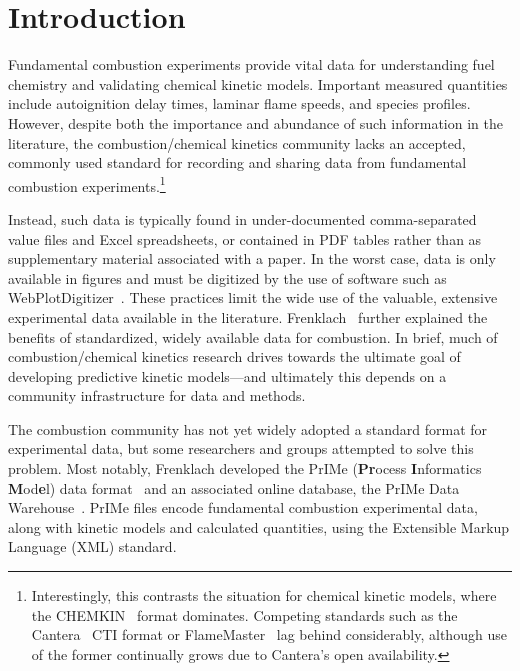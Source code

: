 \documentclass[12pt]{ussci}
\begin{document}
\section{Introduction}
%
Fundamental combustion experiments provide vital data for understanding
fuel chemistry and validating chemical kinetic models. Important measured quantities
include autoignition delay times, laminar flame speeds, and species profiles.
However, despite both the importance and abundance of such information in the literature,
the combustion\slash chemical kinetics community lacks an accepted, commonly used
standard for recording and sharing data from fundamental combustion experiments.\footnote{
Interestingly, this contrasts the situation for chemical kinetic models, where the
CHEMKIN~\autocite{Kee:1996ck} format dominates. Competing standards such as the
Cantera~\autocite{Cantera:2.3.0} CTI format or FlameMaster~\autocite{FlameMaster:ref,FlameMaster:code}
lag behind considerably, although use of the former continually grows due to Cantera's
open availability.
}

Instead, such data is typically found in under-documented
comma-separated value files and Excel spreadsheets, or contained in PDF tables
rather than as supplementary material associated with a paper.
In the worst case, data is only available in figures and must be digitized by the
use of software such as WebPlotDigitizer~\autocite{WebPlotDigitizer}.
These practices limit the wide use of the valuable, extensive experimental data
available in the literature. Frenklach~\autocite{Frenklach:2007bm} further explained the
benefits of standardized, widely available data for combustion.
In brief, much of combustion\slash chemical kinetics research drives towards the ultimate goal
of developing predictive kinetic models---and ultimately this depends on a community
infrastructure for data and methods.

The combustion community has not yet widely adopted a standard format for experimental data,
but some researchers and groups attempted to solve this problem.
Most notably, Frenklach developed the PrIMe (\textbf{Pr}ocess \textbf{I}nformatics
\textbf{M}od\textbf{e}l) data format~\autocite{Frenklach:2007bm,You:2011hy} and an associated
online database, the PrIMe Data Warehouse~\autocite{PrIMe}. PrIMe files encode fundamental
combustion experimental data, along with kinetic models and calculated quantities,
using the Extensible Markup Language (XML) standard.
\end{document}
